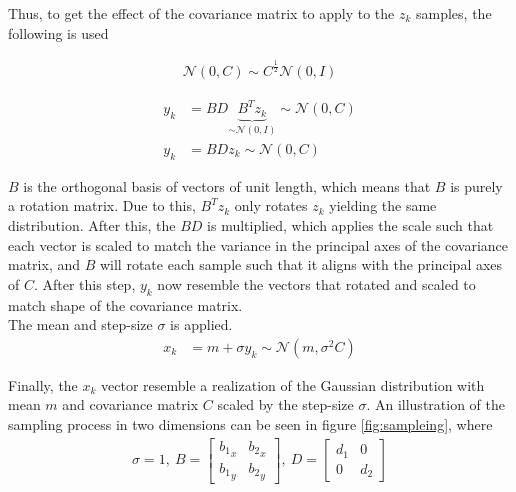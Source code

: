 Thus, to get the effect of the covariance matrix to apply to the $z_k$
samples, the following is used

\begin{align}
\mathcal{N}\left( 0, C \right) \sim C^{\frac{1}{2}} \mathcal{N}\left( 0, I \right)
\end{align}

\begin{align}
y_{k} &= B D \underbrace{B^{T} z_{k}}_{\sim \mathcal{N}(0, I)} \sim \mathcal{N}(0, C)\\
y_{k} &= B Dz_{k} \sim \mathcal{N}(0, C) \label{eq:sampley}
\end{align}

$B$ is the orthogonal basis of vectors of unit length, which means that 
$B$ is purely a rotation matrix. Due to this, $B^{T} z_{k}$ only rotates
$z_k$ yielding the same distribution. After this, the $BD$ is multiplied,
which applies the scale such that each vector is scaled to match the
variance in the principal axes of the covariance matrix, and $B$ 
will rotate each sample such that it aligns with the principal axes
of $C$. After this step, $y_{k}$ now resemble the vectors that rotated and scaled
to match shape of the covariance matrix.\\

The mean and step-size $\sigma$ is applied.
\begin{align}
x_{k} &= m + \sigma y_{k} \sim \mathcal{N}(m, \sigma^2 C) \label{eq:finalSample}
\end{align}



Finally, the $x_{k}$ vector resemble a realization of the Gaussian distribution
with mean $m$ and covariance matrix $C$ scaled by the step-size $\sigma$.
An illustration of the sampling process in two dimensions can be seen in figure \ref{fig:sampleing}, where 
\begin{align}
\sigma = 1,\ B = \begin{bmatrix}
{b_1}_x & {b_2}_x\\
{b_1}_y & {b_2}_y
\end{bmatrix},\ D = \begin{bmatrix}
d_1 & 0\\
0   & d_2
\end{bmatrix}
\end{align}


